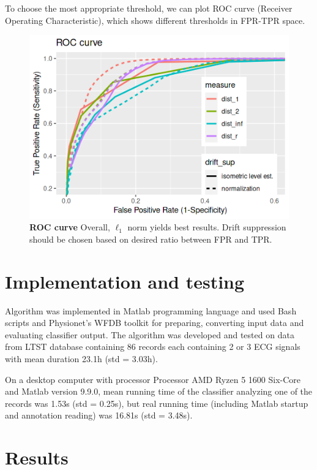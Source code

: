 \documentclass[fleqn,moreauthors,10pt]{ds_report}
\begin{document}
\newpage
To choose the most appropriate threshold, we can plot ROC curve (Receiver Operating Characteristic), which shows different thresholds in FPR-TPR space.

\begin{figure}[!hb]\centering
	\includegraphics[width=\linewidth]{roc.png}
	\caption{\textbf{ROC curve} Overall, $\ell_1$ norm yields best results. Drift suppression should be chosen based on desired ratio between FPR and TPR.}
	\label{fig:roc}
\end{figure}

\section*{Implementation and testing}
\newpage

Algorithm was implemented in Matlab programming language and used Bash scripts and Physionet's WFDB toolkit \cite{wfdb} for preparing, converting input data and evaluating classifier output. The algorithm was developed and tested on data from LTST database \cite{ltst} containing 86 records each containing 2 or 3 ECG signals with mean duration 23.1h (std = 3.03h).

On a desktop computer with processor Processor AMD Ryzen 5 1600 Six-Core and Matlab version 9.9.0, mean running time of the classifier analyzing one of the records was 1.53s (std = 0.25s), but real running time (including Matlab startup and annotation reading) was 16.81s (std = 3.48s).

\section*{Results}
\end{document}
